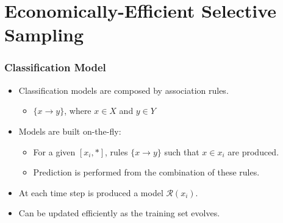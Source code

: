 \documentclass[14pt]{beamer}
\begin{document}
\section{Economically-Efficient Selective Sampling}
\begin{frame}\frametitle{Classification Model}
\begin{itemize}
\item Classification models are composed by association rules.
  \begin{itemize}
    \item $\{x \to y\}$, where $x \in X$ and $y \in Y$
  \end{itemize}
\item Models are built on-the-fly:
  \begin{itemize}
    \item For a given $[x_i, *]$, rules $\{x \to y\}$ such that $x \in x_i$ are produced.
    \item Prediction is performed from the combination of these rules.
  \end{itemize}
\item At each time step is produced a model $\mathcal{R}(x_i)$.
\pause
\item \alert{Can be updated efficiently as the training set evolves.}
\end{itemize}
\end{frame}
\end{document}
